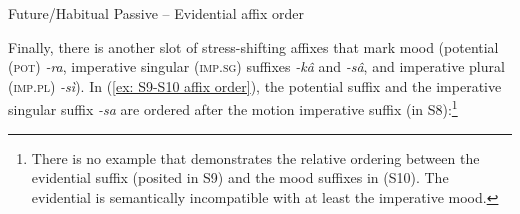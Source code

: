 \ea\label{ex: fut/hab pass -  evidential order}
{Future/Habitual Passive -- Evidential affix order}

    \label{ex: fut/hab pass -  evidential ordera}
        \label{ex: fut/hab pass -  evidential orderb}
            \label{ex: fut/hab pass -  evidential orderc}
    \z
\z

Finally, there is another slot of stress-shifting affixes that mark mood (potential (\textsc{pot}) \textit{-ra}, imperative singular (\textsc{imp.sg}) suffixes \textit{{}-kâ} and \textit{-sâ}, and imperative plural (\textsc{imp.pl}) \textit{-sì}). In (\ref{ex: S9-S10 affix order}), the potential suffix and the imperative singular suffix \textit{-sa} are ordered after the motion imperative suffix (in S8):\footnote{There is no example that demonstrates the relative ordering between the evidential suffix (posited in S9) and the mood suffixes in (S10). The evidential is semantically incompatible with at least the imperative mood.}


